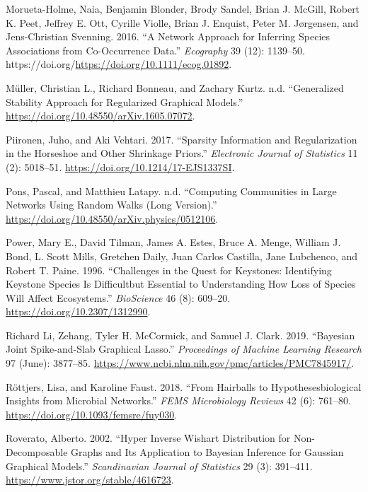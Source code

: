 \documentclass[
  a4paper,
]{article}
\newlength{\cslhangindent}
\newlength{\cslentryspacingunit} %
\newenvironment{CSLReferences}[2] %
 {%
  \setlength{\parindent}{0pt}
  \ifodd #1
  \let\oldpar\par
  \def\par{\hangindent=\cslhangindent\oldpar}
  \fi
  \setlength{\parskip}{#2\cslentryspacingunit}
 }%
 {}
\begin{document}
\begin{CSLReferences}{1}{0}
\leavevmode{}%
Morueta-Holme, Naia, Benjamin Blonder, Brody Sandel, Brian J. McGill,
Robert K. Peet, Jeffrey E. Ott, Cyrille Violle, Brian J. Enquist, Peter
M. Jørgensen, and Jens-Christian Svenning. 2016. {``A Network Approach
for Inferring Species Associations from Co-Occurrence Data.''}
\emph{Ecography} 39 (12): 1139--50.
https://doi.org/\url{https://doi.org/10.1111/ecog.01892}.

\leavevmode{}%
Müller, Christian L., Richard Bonneau, and Zachary Kurtz. n.d.
{``Generalized Stability Approach for Regularized Graphical Models.''}
\url{https://doi.org/10.48550/arXiv.1605.07072}.

\leavevmode{}%
Piironen, Juho, and Aki Vehtari. 2017. {``Sparsity Information and
Regularization in the Horseshoe and Other Shrinkage Priors.''}
\emph{Electronic Journal of Statistics} 11 (2): 5018--51.
\url{https://doi.org/10.1214/17-EJS1337SI}.

\leavevmode{}%
Pons, Pascal, and Matthieu Latapy. n.d. {``Computing Communities in
Large Networks Using Random Walks (Long Version).''}
\url{https://doi.org/10.48550/arXiv.physics/0512106}.

\leavevmode{}%
Power, Mary E., David Tilman, James A. Estes, Bruce A. Menge, William J.
Bond, L. Scott Mills, Gretchen Daily, Juan Carlos Castilla, Jane
Lubchenco, and Robert T. Paine. 1996. {``Challenges in the Quest for
Keystones: Identifying Keystone Species Is Difficult{\textemdash}but
Essential to Understanding How Loss of Species Will Affect
Ecosystems.''} \emph{BioScience} 46 (8): 609--20.
\url{https://doi.org/10.2307/1312990}.

\leavevmode{}%
Richard Li, Zehang, Tyler H. McCormick, and Samuel J. Clark. 2019.
{``Bayesian Joint Spike-and-Slab Graphical Lasso.''} \emph{Proceedings
of Machine Learning Research} 97 (June): 3877--85.
\url{https://www.ncbi.nlm.nih.gov/pmc/articles/PMC7845917/}.

\leavevmode{}%
Röttjers, Lisa, and Karoline Faust. 2018. {``From Hairballs to
Hypotheses{\textendash}biological Insights from Microbial Networks.''}
\emph{FEMS Microbiology Reviews} 42 (6): 761--80.
\url{https://doi.org/10.1093/femsre/fuy030}.

\leavevmode{}%
Roverato, Alberto. 2002. {``Hyper Inverse Wishart Distribution for
Non-Decomposable Graphs and Its Application to Bayesian Inference for
Gaussian Graphical Models.''} \emph{Scandinavian Journal of Statistics}
29 (3): 391--411. \url{https://www.jstor.org/stable/4616723}.


\end{CSLReferences}
\end{document}
